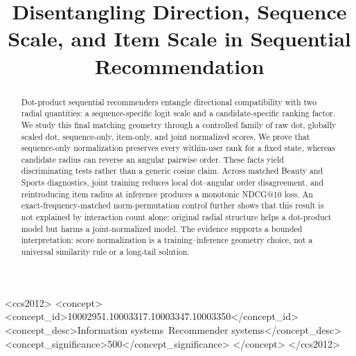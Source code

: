 \documentclass[sigconf,anonymous,review]{acmart}
\begin{document}
\title{Disentangling Direction, Sequence Scale, and Item Scale in Sequential Recommendation}
\begin{abstract}
Dot-product sequential recommenders entangle directional compatibility with two radial quantities: a sequence-specific logit scale and a candidate-specific ranking factor. We study this final matching geometry through a controlled family of raw dot, globally scaled dot, sequence-only, item-only, and joint normalized scores. We prove that sequence-only normalization preserves every within-user rank for a fixed state, whereas candidate radius can reverse an angular pairwise order. These facts yield discriminating tests rather than a generic cosine claim. Across matched Beauty and Sports diagnostics, joint training reduces local dot--angular order disagreement, and reintroducing item radius at inference produces a monotonic NDCG@10 loss. An exact-frequency-matched norm-permutation control further shows that this result is not explained by interaction count alone: original radial structure helps a dot-product model but harms a joint-normalized model. The evidence supports a bounded interpretation: score normalization is a training--inference geometry choice, not a universal similarity rule or a long-tail solution.
\end{abstract}
\begin{CCSXML}
<ccs2012>
<concept>
<concept_id>10002951.10003317.10003347.10003350</concept_id>
<concept_desc>Information systems~Recommender systems</concept_desc>
<concept_significance>500</concept_significance>
</concept>
</ccs2012>
\end{CCSXML}
\maketitle
\end{document}
